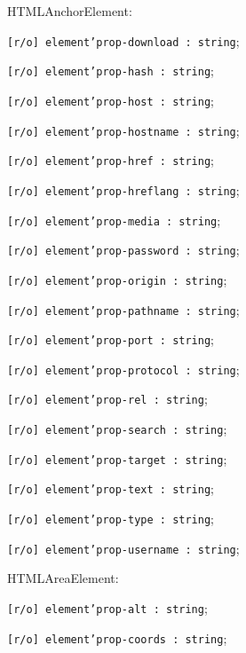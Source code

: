 \begin{icItems}
	\item HTMLAnchorElement:
	\begin{icItems}
		\item \texttt{[r/o] element'prop-download : string};
		\item \texttt{[r/o] element'prop-hash : string};
		\item \texttt{[r/o] element'prop-host : string};
		\item \texttt{[r/o] element'prop-hostname : string};
		\item \texttt{[r/o] element'prop-href : string};
		\item \texttt{[r/o] element'prop-hreflang : string};
		\item \texttt{[r/o] element'prop-media : string};
		\item \texttt{[r/o] element'prop-password : string};
		\item \texttt{[r/o] element'prop-origin : string};
		\item \texttt{[r/o] element'prop-pathname : string};
		\item \texttt{[r/o] element'prop-port : string};
		\item \texttt{[r/o] element'prop-protocol : string};
		\item \texttt{[r/o] element'prop-rel : string};
		\item \texttt{[r/o] element'prop-search : string};
		\item \texttt{[r/o] element'prop-target : string};
		\item \texttt{[r/o] element'prop-text : string};
		\item \texttt{[r/o] element'prop-type : string};
		\item \texttt{[r/o] element'prop-username : string};
	\end{icItems}
	
	\item HTMLAreaElement:
	\begin{icItems}
		\item \texttt{[r/o] element'prop-alt : string};
		\item \texttt{[r/o] element'prop-coords : string};
	\end{icItems}
	

\end{icItems}
